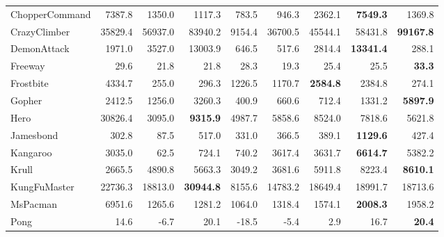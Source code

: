 \begin{table*}[h]
\begin{center}
\begin{small}
{\begin{tabular}{lrr rrrrrr}
ChopperCommand       &  7387.8    &  1350.0    &  1117.3             &  783.5    &  946.3     &  2362.1              &  \textbf{7549.3}    &  1369.8                   \\
CrazyClimber         &  35829.4   &  56937.0   &  83940.2            &  9154.4   &  36700.5   &  45544.1             &  58431.8            &  \textbf{99167.8}         \\
DemonAttack          &  1971.0    &  3527.0    &  13003.9            &  646.5    &  517.6     &  2814.4              &  \textbf{13341.4}   &  288.1                    \\
Freeway              &  29.6      &  21.8      &  21.8               &  28.3     &  19.3      &  25.4                &  25.5               &  \textbf{33.3}            \\
Frostbite            &  4334.7    &  255.0     &  296.3              &  1226.5   &  1170.7    &  \textbf{2584.8}     &  2384.8             &  274.1                    \\
Gopher               &  2412.5    &  1256.0    &  3260.3             &  400.9    &  660.6     &  712.4               &  1331.2             &  \textbf{5897.9}          \\
Hero                 &  30826.4   &  3095.0    &  \textbf{9315.9}    &  4987.7   &  5858.6    &  8524.0              &  7818.6             &  5621.8                   \\
Jamesbond            &  302.8     &  87.5      &  517.0              &  331.0    &  366.5     &  389.1               &  \textbf{1129.6}    &  427.4                    \\
Kangaroo             &  3035.0    &  62.5      &  724.1              &  740.2    &  3617.4    &  3631.7              &  \textbf{6614.7}    &  5382.2                   \\
Krull                &  2665.5    &  4890.8    &  5663.3             &  3049.2   &  3681.6    &  5911.8              &  8223.4             &  \textbf{8610.1}          \\
KungFuMaster         &  22736.3   &  18813.0   &  \textbf{30944.8}   &  8155.6   &  14783.2   &  18649.4             &  18991.7            &  18713.6                  \\
MsPacman             &  6951.6    &  1265.6    &  1281.2             &  1064.0   &  1318.4    &  1574.1              &  \textbf{2008.3}    &  1958.2                   \\
Pong                 &  14.6      &  -6.7      &  20.1               &  -18.5    &  -5.4      &  2.9                 &  16.7               &  \textbf{20.4}            \\

\end{tabular}}
\end{small}
\end{center}
\end{table*}
